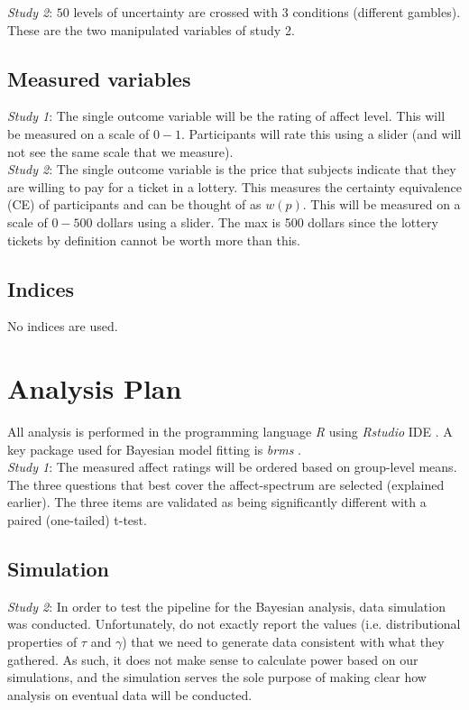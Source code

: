 \documentclass[12pt]{article}
\begin{document}
\emph{Study 2}: $50$ levels of uncertainty are
crossed with  $3$ conditions (different gambles).
These are the two manipulated variables of
study 2.

\subsection{Measured variables}

\emph{Study 1}: The single outcome variable
will be the rating of affect level. This will
be measured on a scale of $0-1$. Participants
will rate this using a slider (and will not see
the same scale that we measure). \\

\emph{Study 2}: The single outcome variable
is the price that subjects indicate that they
are willing to pay for a ticket in a lottery.
This measures the certainty equivalence (CE) of
participants and can be thought of as $w(p)$.
This will be measured on a scale of $0-500$ dollars
using a slider. The max is 500 dollars since the
lottery tickets by definition cannot be worth
more than this.

\subsection{Indices}

No indices are used.

\section{Analysis Plan}

All analysis is performed in the programming
language \emph{R} \autocite{rcore} using
\emph{Rstudio} IDE
\autocite{rstudio}. A key package used for
Bayesian model fitting is \emph{brms}
\autocite{brms}. \\

\emph{Study 1}: The measured affect ratings will be
ordered based on group-level means. The
three questions that best cover the affect-spectrum
are selected (explained earlier). The three items
are validated as being significantly different
with a paired (one-tailed) t-test.

\subsection{Simulation}

\emph{Study 2}: In order to test the pipeline for the
Bayesian analysis, data simulation was
conducted. Unfortunately, \textcite{gonzalez1999shape}
do not exactly report the values (i.e.
distributional properties of $\tau$ and
$\gamma$) that we need
to generate data consistent with what they
gathered. As such, it does not make sense
to calculate power based on our simulations,
and the simulation serves the sole purpose
of making clear how analysis on eventual data
will be conducted. \\
\end{document}
